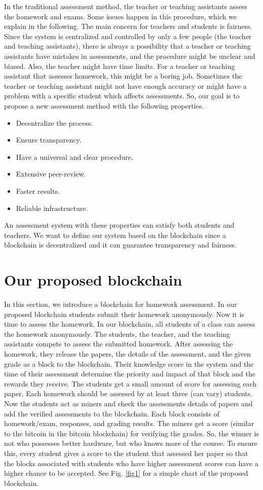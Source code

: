 \documentclass[manuscript,review,anonymous]{acmart}%
\begin{document}
In the traditional assessment method, the teacher or teaching assistants assess the homework and exams. Some issues happen in this procedure, which we explain in the following.
The main concern for teachers and students is fairness. Since the system is centralized and controlled by only a few people (the teacher and teaching assistants), there is always a possibility that a teacher or teaching assistants have mistakes in assessments, and the procedure might be unclear and biased.
Also, the teacher might have time limits. For a teacher or teaching assistant that assesses homework, this might be a boring job. Sometimes the teacher or teaching assistant might not have enough accuracy or might have a problem with a specific student which affects assessments.
So, our goal is to propose a new assessment method with the following properties.
\begin{itemize}
\item Decentralize the process. 
\item Ensure transparency. 
\item Have a universal and clear procedure. 
\item Extensive peer-review. 
\item Faster results.
\item Reliable infrastructure.
\end{itemize}

An assessment system with these properties can satisfy both students and teachers. We want to define our system based on the blockchain since a blockchain is decentralized and it can guarantee transparency and fairness.


\section{Our proposed blockchain}
In this section, we introduce a blockchain for homework assessment.
In our proposed blockchain students submit their homework anonymously. Now it is time to assess the homework. In our blockchain, all students of a class can assess the homework anonymously.
The students, the teacher, and the teaching assistants compete to assess the submitted homework. After assessing the homework, they release the papers, the details of the assessment, and the given grade as a block to the blockchain. Their knowledge score in the system and the time of their assessment determine the priority and impact of that block and the rewards they receive.
  The students get a small amount of score for assessing each paper. Each homework should be assessed by at least three (can vary) students. Now the students act as miners and check the assessments details of papers and add the verified assessments to the blockchain. Each block consists of homework/exam, responses, and grading results. The miners get a score (similar to the bitcoin in the bitcoin blockchain) for verifying the grades. So, the winner is not who possesses better hardware, but who knows more of the course.
To ensure this, every student gives a score to the student that assessed her paper 
so that the blocks associated with students who have higher assessment scores can have a higher chance to be accepted.
See Fig. \ref{fig1} for a simple chart of the proposed blockchain.
\end{document}
